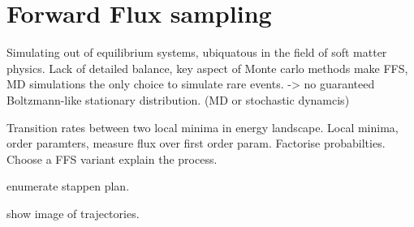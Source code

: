 \section{Forward Flux sampling}


Simulating out of equilibrium systems, ubiquatous in the field of soft matter physics.
Lack of detailed balance, key aspect of Monte carlo methods make FFS, MD simulations the
only choice to simulate rare events. -> no guaranteed Boltzmann-like stationary
distribution.  (MD or stochastic
dynamcis)


Transition rates between two local minima in energy landscape.
Local minima, order paramters, measure flux over first order param. Factorise
probabilties. Choose a FFS variant explain the process.


enumerate stappen plan.

show image of trajectories.
